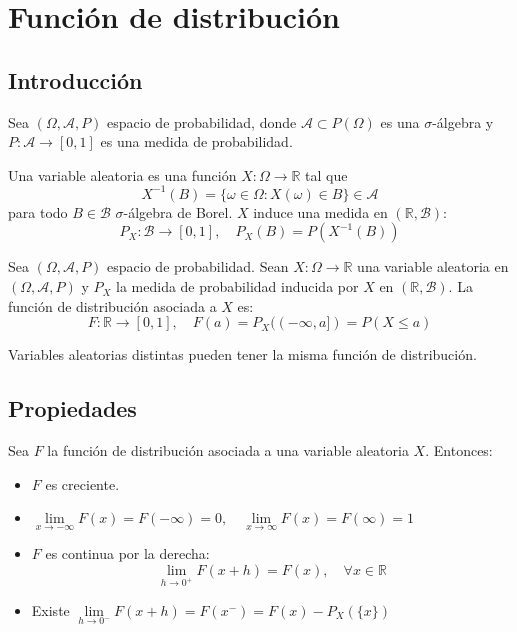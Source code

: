 \chapter{Función de distribución}
\section{Introducción}
Sea $(\Omega, \mathcal{A}, P)$ espacio de probabilidad, donde $\mathcal{A} \subset P(\Omega)$ es una $\sigma$-álgebra y $P: \mathcal{A} \to [0, 1]$ es una medida de probabilidad.

Una variable aleatoria es una función $X: \Omega \to \mathbb{R}$ tal que
$$X^{-1}(B) = \{ \omega \in \Omega : X(\omega) \in B \} \in \mathcal{A}$$
para todo $B \in \mathcal{B}$ $\sigma$-álgebra de Borel.
$X$ induce una medida en $(\mathbb{R}, \mathcal{B})$:
$$P_X: \mathcal{B} \to [0, 1], \quad P_X(B) = P(X^{-1}(B))$$

\begin{definition}
    Sea $(\Omega, \mathcal{A}, P)$ espacio de probabilidad.
    Sean $X: \Omega \to \mathbb{R}$ una variable aleatoria en $(\Omega, \mathcal{A}, P)$ y $P_X$ la medida de probabilidad inducida por $X$ en $(\mathbb{R}, \mathcal{B})$.
    La función de distribución asociada a $X$ es:
    $$F: \mathbb{R} \to [0, 1], \quad F(a) = P_X((-\infty, a]) = P(X \leq a)$$
\end{definition}

\begin{note}
    Variables aleatorias distintas pueden tener la misma función de distribución.
\end{note}

\section{Propiedades}
Sea $F$ la función de distribución asociada a una variable aleatoria $X$.
Entonces:
\begin{itemize}
    \item $F$ es creciente.
    \item $\lim\limits_{x \to -\infty} F(x) = F(-\infty) = 0, \quad \lim\limits_{x \to \infty} F(x) = F(\infty) = 1$
    \item $F$ es continua por la derecha: $$\lim\limits_{h \to 0^+} F(x+h) = F(x), \quad \forall x \in \mathbb{R}$$
    \item Existe $\lim\limits_{h \to 0^-} F(x+h) = F(x^-) = F(x) - P_X(\{x\})$
\end{itemize}


